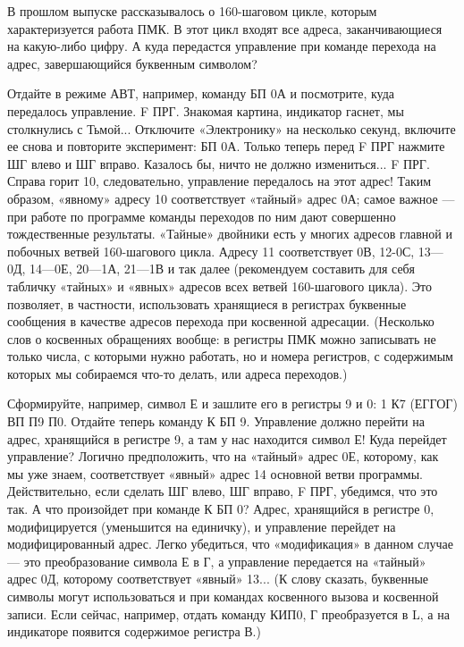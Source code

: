 \documentclass[11pt,a4paper,oneside]{article}
\begin{document}
В прошлом выпуске рассказывалось о 160-шаговом цикле, которым характеризуется работа ПМК. В этот цикл входят все адреса, заканчивающиеся на какую-либо цифру. А куда передастся управление при команде перехода на адрес, завершающийся буквенным символом?

Отдайте в режиме АВТ, например, команду БП 0А и посмотрите, куда передалось управление. F ПРГ. Знакомая картина, индикатор гаснет, мы столкнулись с Тьмой... Отключите «Электронику» на несколько секунд, включите ее снова и повторите эксперимент: БП 0А. Только теперь перед F ПРГ нажмите ШГ влево и ШГ вправо. Казалось бы, ничто не должно измениться... F ПРГ. Справа горит 10, следовательно, управление передалось на этот адрес! Таким образом, «явному» адресу 10 соответствует «тайный» адрес 0А; самое важное — при работе по программе команды переходов по ним дают совершенно тождественные результаты.
«Тайные» двойники есть у многих адресов главной и побочных ветвей 160-шагового цикла. Адресу 11 соответствует 0В, 12-0С, 13—0Д, 14—0Е, 20—1А, 21—1В и так далее (рекомендуем составить для себя табличку «тайных» и «явных» адресов всех ветвей 160-шагового цикла). Это позволяет, в частности, использовать хранящиеся в регистрах буквенные сообщения в качестве адресов перехода при косвенной адресации. (Несколько слов о косвенных обращениях вообще: в регистры ПМК можно записывать не только числа, с которыми нужно работать, но и номера регистров, с содержимым которых мы собираемся что-то делать, или адреса переходов.)

Сформируйте, например, символ Е и зашлите его в регистры 9 и 0: 1 К7 (ЕГГОГ) ВП П9 П0. Отдайте теперь команду К БП 9. Управление должно перейти на адрес, хранящийся в регистре 9, а там у нас находится символ Е! Куда перейдет управление? Логично предположить, что на «тайный» адрес 0Е, которому, как мы уже знаем, соответствует «явный» адрес 14 основной
ветви программы. Действительно, если сделать ШГ влево, ШГ вправо, F ПРГ, убедимся, что это так. А что произойдет при команде К БП 0? Адрес, хранящийся в регистре 0, модифицируется (уменьшится на единичку), и управление перейдет на модифицированный адрес. Легко убедиться, что «модификация» в данном случае — это преобразование символа Е в Г, а управление передается на «тайный» адрес 0Д, которому соответствует «явный» 13... (К слову сказать, буквенные символы могут использоваться и при командах косвенного вызова и косвенной записи. Если сейчас, например, отдать команду КИП0, Г преобразуется в L, а на индикаторе появится содержимое регистра В.)
\end{document}
